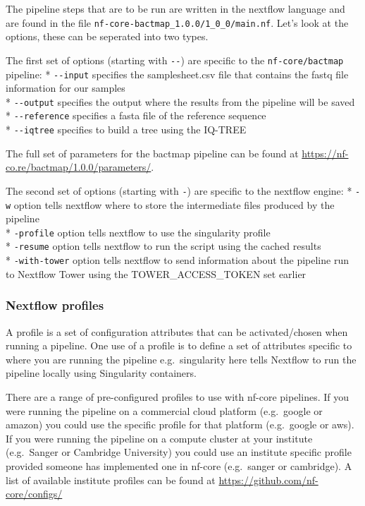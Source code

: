 \documentclass[11pt]{article}
\begin{document}
    The pipeline steps that are to be run are written in the nextflow
language and are found in the file
\texttt{nf-core-bactmap\_1.0.0/1\_0\_0/main.nf}. Let's look at the
options, these can be seperated into two types.

The first set of options (starting with \texttt{-\/-}) are specific to
the \texttt{nf-core/bactmap} pipeline: * \texttt{-\/-input} specifies
the samplesheet.csv file that contains the fastq file information for
our samples\\
* \texttt{-\/-output} specifies the output where the results from the
pipeline will be saved\\
* \texttt{-\/-reference} specifies a fasta file of the reference
sequence\\
* \texttt{-\/-iqtree} specifies to build a tree using the IQ-TREE

The full set of parameters for the bactmap pipeline can be found at
\url{https://nf-co.re/bactmap/1.0.0/parameters/}.

The second set of options (starting with \texttt{-}) are specific to the
nextflow engine: * \texttt{-w} option tells nextflow where to store the
intermediate files produced by the pipeline\\
* \texttt{-profile} option tells nextflow to use the singularity
profile\\
* \texttt{-resume} option tells nextflow to run the script using the
cached results\\
* \texttt{-with-tower} option tells nextflow to send information about
the pipeline run to Nextflow Tower using the TOWER\_ACCESS\_TOKEN set
earlier

    \hypertarget{nextflow-profiles}{%
\subsubsection{Nextflow profiles}\label{nextflow-profiles}}

A profile is a set of configuration attributes that can be
activated/chosen when running a pipeline. One use of a profile is to
define a set of attributes specific to where you are running the
pipeline e.g.~singularity here tells Nextflow to run the pipeline
locally using Singularity containers.

There are a range of pre-configured profiles to use with nf-core
pipelines. If you were running the pipeline on a commercial cloud
platform (e.g.~google or amazon) you could use the specific profile for
that platform (e.g.~google or aws). If you were running the pipeline on
a compute cluster at your institute (e.g.~Sanger or Cambridge
University) you could use an institute specific profile provided someone
has implemented one in nf-core (e.g.~sanger or cambridge). A list of
available institute profiles can be found at
\url{https://github.com/nf-core/configs/}
\end{document}
